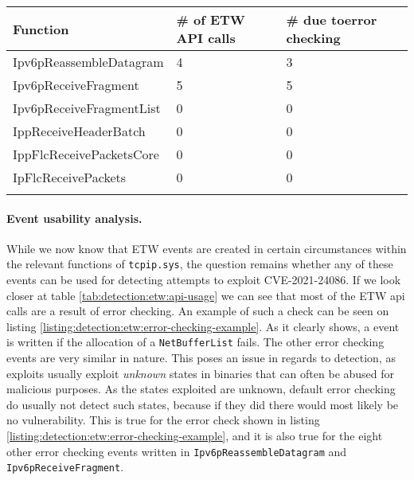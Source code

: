 \documentclass{report}
\begin{document}
{
\begin{tabularx}{\textwidth}{llX}
\textbf{Function}        & \textbf{\# of \gls{ETW} API calls} & \textbf{\# due to\newline error checking} \\ \hline
Ipv6pReassembleDatagram  & 4                            & 3                                 \\
Ipv6pReceiveFragment     & 5                            & 5                                 \\
Ipv6pReceiveFragmentList & 0                            & 0                                 \\
IppReceiveHeaderBatch    & 0                            & 0                                 \\
IppFlcReceivePacketsCore & 0                            & 0                                 \\
IpFlcReceivePackets      & 0                            & 0                                 \\
\caption{\gls{ETW} API calls for functions related to CVE-2021-24086}
\label{tab:detection:etw:api-usage}
\end{tabularx}
}


\paragraph{Event usability analysis.}
While we now know that \gls{ETW} events are created in certain circumstances within the relevant functions of \texttt{tcpip.sys}, the question remains whether any of these events can be used for detecting attempts to exploit CVE-2021-24086. If we look closer at table \ref{tab:detection:etw:api-usage} we can see that most of the \gls{ETW} api calls are a result of error checking. An example of such a check can be seen on listing \ref{listing:detection:etw:error-checking-example}. As it clearly shows, a event is written if the allocation of a \texttt{NetBufferList} fails. The other error checking events are very similar in nature. This poses an issue in regards to detection, as exploits usually exploit \emph{unknown} states in binaries that can often be abused for malicious purposes. As the states exploited are unknown, default error checking do usually not detect such states, because if they did there would most likely be no vulnerability. This is true for the error check shown in listing \ref{listing:detection:etw:error-checking-example}, and it is also true for the eight other error checking events written in \texttt{Ipv6pReassembleDatagram} and \texttt{Ipv6pReceiveFragment}.
\end{document}
